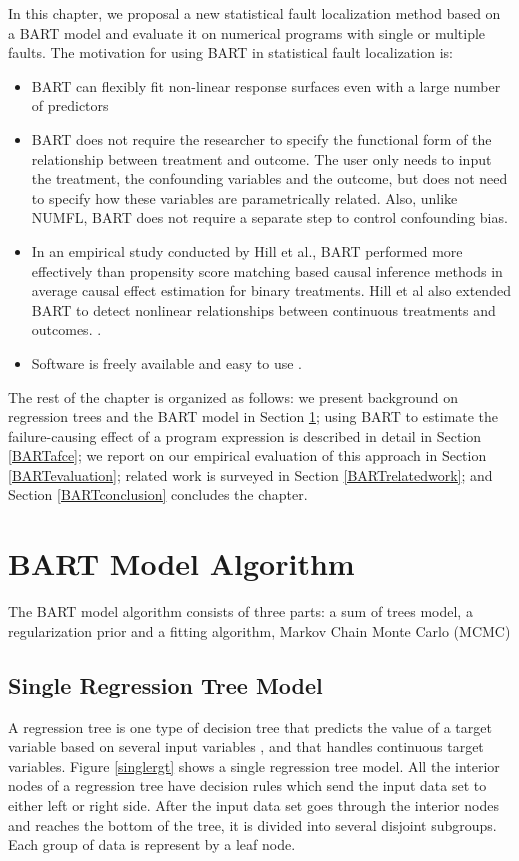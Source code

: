 In this chapter, we proposal a new statistical fault localization method based on a BART model and evaluate it on numerical programs with single or multiple faults. The motivation for using BART in statistical fault localization is:
\vspace{-0.2cm}
\begin{itemize}
\item BART can flexibly fit non-linear response surfaces even with a large number of predictors
\item BART does not require the researcher to specify the functional form of the relationship between treatment and outcome. The user only needs to input the treatment, the confounding variables and the outcome, but does not need to specify how these variables are parametrically related. Also, unlike NUMFL, BART does not require a separate step to control confounding bias.
\item In an empirical study conducted by Hill et al., BART performed more effectively than propensity score matching based causal inference methods in average causal effect estimation for binary treatments. Hill et al also extended BART to detect nonlinear relationships between continuous treatments and outcomes. \cite{hill2012bayesian, hill2013assessing}.
\item Software is freely available and easy to use \cite{BARTMachine}.
\end{itemize}

The rest of the chapter is organized as follows: we present background on regression trees and the BART model in Section \ref{BARTbg}; using BART to estimate the failure-causing effect of a program expression is described in detail in Section \ref{BARTafce};  we report on our empirical evaluation of this approach in Section \ref{BARTevaluation}; related work is surveyed in Section \ref{BARTrelatedwork}; and Section \ref{BARTconclusion} concludes the chapter.

\section{BART Model Algorithm}\label{BARTbg}%
The BART model algorithm consists of three parts: a sum of trees model, a regularization prior and a fitting algorithm, Markov Chain Monte Carlo (MCMC)
\subsection{Single Regression Tree Model}
A regression tree is one type of decision tree that predicts the value of a target variable based on several input variables \cite{loh2011classification}, and that handles continuous target variables. Figure \ref{singlergt} shows a single regression tree model. All the interior nodes of a regression tree have decision rules which send the input data set to either left or right side. After the input data set goes through the interior nodes and reaches the bottom of the tree, it is divided into several disjoint subgroups. Each group of data is represent by a leaf node.

